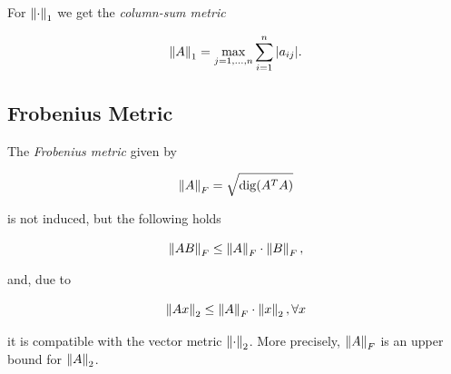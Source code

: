 For \(\left\| \cdot \right\|_1\) we get the \emph{column-sum metric} 

\[ 
    \left\| A \right\|_1 = \max_{j=1,\dots,n} \sum_{i = 1}^n |a_{ij}|.
\]

\subsection{Frobenius Metric}

The \emph{Frobenius metric} given by 

\[
    \left\| A \right\|_F = \sqrt{\mathrm{dig}(A^T A)}
\]

is not induced, but the following holds 

\[
    \left\| AB \right\|_F \le \left\| A \right\|_F \cdot \left\| B \right\|_F,
\]

and, due to 

\[ 
    \left\| Ax \right\|_2 \le \left\| A \right\|_F \cdot \left\| x \right\|_2, \forall x
\]

it is compatible with the vector metric \(\left\| \cdot \right\|_2\). More precisely, \(\left\| A \right\|_F\) is an upper bound for \(\left\| A \right\|_2\).

